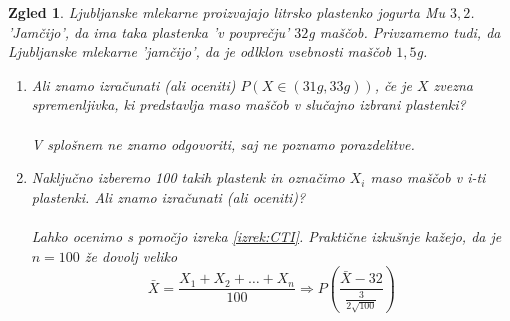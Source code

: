 \documentclass[11pt]{article}
\newtheorem{Zgled}[Izrek]{{\sc Zgled}}
\begin{document}
\begin{Zgled}
	\textnormal{Ljubljanske mlekarne proizvajajo litrsko plastenko jogurta Mu $3,2$. 'Jamčijo', da ima taka plastenka 'v povprečju' $32$g maščob. Privzamemo tudi, da Ljubljanske mlekarne 'jamčijo', da je odlklon vsebnosti maščob $1,5$g.}
	\\
	\begin{enumerate}
		\item
		Ali znamo izračunati (ali oceniti) $P(X\in (31g, 33g))$, če je $X$ zvezna spremenljivka, ki predstavlja maso maščob v slučajno izbrani plastenki?
		\\
		\\
		\textnormal{V splošnem ne znamo odgovoriti, saj ne poznamo porazdelitve.}
		\item
		Naključno izberemo 100 takih plastenk in označimo $X_i$ maso maščob v i-ti plastenki. Ali znamo izračunati (ali oceniti)?
		\\
		\\
		\textnormal{Lahko ocenimo s pomočjo izreka} \ref{izrek:CTI}. \textnormal{Praktične izkušnje kažejo, da je $n= 100$ že dovolj veliko}
		\\
		$$\bar{X} = \frac{X_1 + X_2 + \ldots + X_n}{100} \Rightarrow P\left(\frac{\bar{X} - 32}{\frac{3}{2\sqrt{100}}}\right)$$
	\end{enumerate}
\end{Zgled}
	
\end{document}
